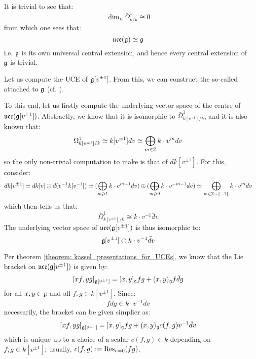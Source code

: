         \begin{example}
           It is trivial to see that:
                $$\dim_k \bar{\Omega}^1_{k/k} \cong 0$$
            from which one sees that:
                $$\mathfrak{uce}(\mathfrak{g}) \simeq \mathfrak{g}$$
            i.e. $\mathfrak{g}$ is its own universal central extension, and hence every central extension of $\mathfrak{g}$ is trivial.
        \end{example}
        \begin{example}
            Let us compute the UCE of $\mathfrak{g}[v^{\pm 1}]$. From this, we can construct the so-called  attached to $\mathfrak{g}$ (cf. \cite[Chapter 7]{kac_infinite_dimensional_lie_algebras}). 

            To this end, let us firstly compute the underlying vector space of the centre of $\mathfrak{uce}(\mathfrak{g}[v^{\pm 1}])$. Abstractly, we know that it is isomorphic to $\bar{\Omega}^1_{k[v^{\pm 1}]/k}$, and it is also known that:
                $$\Omega^1_{k[v^{\pm 1}]/k} \simeq k[v^{\pm 1}] dv \simeq \bigoplus_{m \in \mathbb{Z}} k \cdot v^m dv$$
            so the only non-trivial computation to make is that of $d k[v^{\pm 1}]$. For this, consider:
                $$d k[v^{\pm 1}] \simeq d k[v] \oplus d(v^{-1} k[v^{-1}]) \simeq ( \bigoplus_{m \geqslant 1} k \cdot v^{m - 1} dv ) \oplus ( \bigoplus_{m \geqslant 0} k \cdot v^{-m - 1} dv ) \simeq \bigoplus_{m \in \mathbb{Z} \smallsetminus \{-1\}} k \cdot v^m dv$$
            which then tells us that:
                $$\bar{\Omega}^1_{k[v^{\pm 1}]/k} \cong k \cdot v^{-1} \bar{d}v$$
            The underlying vector space of $\mathfrak{uce}(\mathfrak{g}[v^{\pm 1}])$ is thus isomorphic to:
                $$\mathfrak{g}[v^{\pm 1}] \oplus k \cdot v^{-1} \bar{d}v$$

            Per theorem \ref{theorem: kassel_presentations_for_UCEs}, we know that the Lie bracket on $\mathfrak{uce}(\mathfrak{g}[v^{\pm 1}])$ is given by:
                $$[x f, y g]_{\mathfrak{g}[v^{\pm 1}]} = [x, y]_{\mathfrak{g}} fg + (x, y)_{\mathfrak{g}} f \bar{d}g$$
            for all $x, y \in \mathfrak{g}$ and all $f, g \in k[v^{\pm 1}]$. Since:
                $$f \bar{d}g \in k \cdot v^{-1} \bar{d}v$$
            necessarily, the bracket can be given simplier as:
                $$[x f, y g]_{\mathfrak{g}[v^{\pm 1}]} = [x, y]_{\mathfrak{g}} fg + (x, y)_{\mathfrak{g}} c(f, g) v^{-1} \bar{d}v$$
            which is unique up to a choice of a scalar $c(f, g) \in k$ depending on $f, g \in k[v^{\pm 1}]$; usually, $c(f, g) := \mathrm{Res}_{v = 0}(fg)$.


\end{example}
